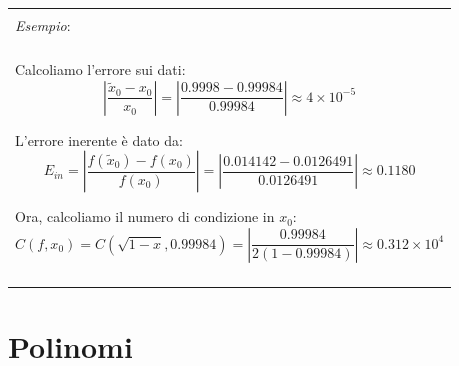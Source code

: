 \documentclass{article}
\newenvironment{example}
{\begin{center}
        \begin{tabular}{|p{0.9\textwidth}|}
            \hline \\ 
            \textit{Esempio}: \\\\ 
        }
        {
            \\\\ \hline
        \end{tabular}
    \end{center}
}
\begin{document}
\begin{example}
Calcoliamo l'errore sui dati:
$$\left\lvert\frac{\tilde{x}_0 - x_0}{x_0}\right\rvert =
\left\lvert\frac{0.9998 - 0.99984}{0.99984}\right\rvert \approx 4 \times 10^{-5}$$

L'errore inerente è dato da:
$$E_{in}=\left\lvert
\frac{f(\tilde{x}_0)-f(x_0)}{f(x_0)}\right\rvert=\left\lvert
\frac{0.014142-0.0126491}{0.0126491}\right\rvert\approx 0.1180$$

Ora, calcoliamo il numero di condizione in $x_0$:
$$C(f, x_0) = C(\sqrt{1-x}, 0.99984) =
\left\lvert\frac{0.99984}{2(1-0.99984)}\right\rvert \approx 0.312 \times 10^4$$
\end{example}

\newpage
\section{Polinomi}
\end{document}
